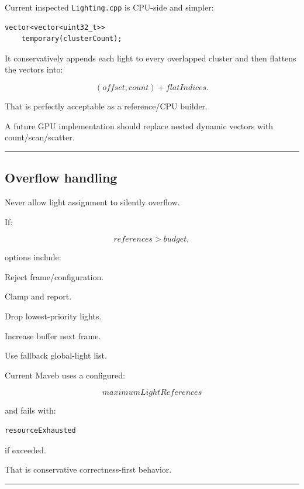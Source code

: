 \hypertarget{04-visual-computing-ii-ch040-current-maveb-construction}{}

Current inspected \texttt{Lighting.cpp} is CPU-side and simpler:

\begin{verbatim}
vector<vector<uint32_t>>
    temporary(clusterCount);
\end{verbatim}

It conservatively appends each light to every overlapped cluster and then flattens the vectors into:

\[
(offset,count)
+
flatIndices.
\]

That is perfectly acceptable as a reference/CPU builder.

A future GPU implementation should replace nested dynamic vectors with count/scan/scatter.

\begin{center}\rule{0.5\linewidth}{0.5pt}\end{center}

\subsection{Overflow handling}\label{04-visual-computing-ii-ch040-overflow-handling}

\hypertarget{04-visual-computing-ii-ch040-overflow-handling}{}

Never allow light assignment to silently overflow.

If:

\[
references>budget,
\]

options include:

Reject frame/configuration.

Clamp and report.

Drop lowest-priority lights.

Increase buffer next frame.

Use fallback global-light list.

Current Maveb uses a configured:

\[
maximumLightReferences
\]

and fails with:

\begin{verbatim}
resourceExhausted
\end{verbatim}

if exceeded.

That is conservative correctness-first behavior.

\begin{center}\rule{0.5\linewidth}{0.5pt}\end{center}


